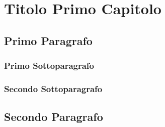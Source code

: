 \chapter{Titolo Primo Capitolo}
\label{chap:titolocapitolo01}

\lipsum[1]

\section{Primo Paragrafo}
\lipsum[2-3]


\subsection{Primo Sottoparagrafo}
\lipsum[4-5]

\subsection{Secondo Sottoparagrafo}
\lipsum[6-7]

\section{Secondo Paragrafo}
\lipsum[1-7]
